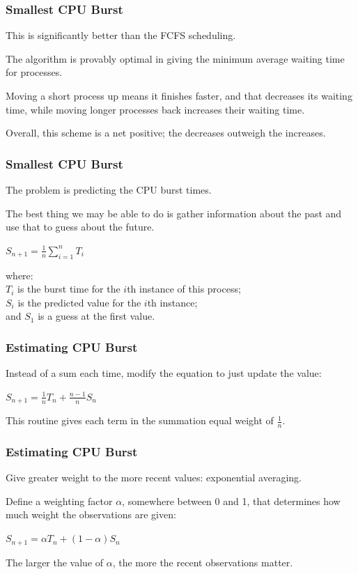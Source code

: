 \begin{frame}
\frametitle{Smallest CPU Burst}

This is significantly better than the FCFS scheduling. 

The algorithm is provably optimal in giving the minimum average waiting time for processes. 

Moving a short process up means it finishes faster, and that decreases its waiting time, while moving longer processes back increases their waiting time. 

Overall, this scheme is a net positive; the decreases outweigh the increases.

\end{frame}

\begin{frame}
\frametitle{Smallest CPU Burst}

The problem is predicting the CPU burst times. 

The best thing we may be able to do is gather information about the past and use that to guess about the future. 

\begin{center}
$S_{n+1} = \frac{1}{n}\displaystyle\sum_{i=1}^{n}T_{i}$
\end{center}

where:\\
\quad $T_{i}$ is the burst time for the $i$th instance of this process;\\
\quad $S_{i}$ is the predicted value for the $i$th instance; \\
\quad and $S_{1}$ is a guess at the first value.

\end{frame}

\begin{frame}
\frametitle{Estimating CPU Burst}

Instead of a sum each time, modify the equation to just update the value:

\begin{center}
$S_{n+1} = \frac{1}{n}T_{n} + \frac{n - 1}{n} S_{n}$
\end{center}

This routine gives each term in the summation equal weight of $\frac{1}{n}$. 

\end{frame}


\begin{frame}
\frametitle{Estimating CPU Burst}

Give greater weight to the more recent values: exponential averaging. 

Define a weighting factor $\alpha$, somewhere between 0 and 1, that determines how much weight the observations are given:

\begin{center}
$S_{n+1} = \alpha T_{n} + (1 - \alpha) S_{n}$
\end{center}

The larger the value of $\alpha$, the more the recent observations matter.

\end{frame}

